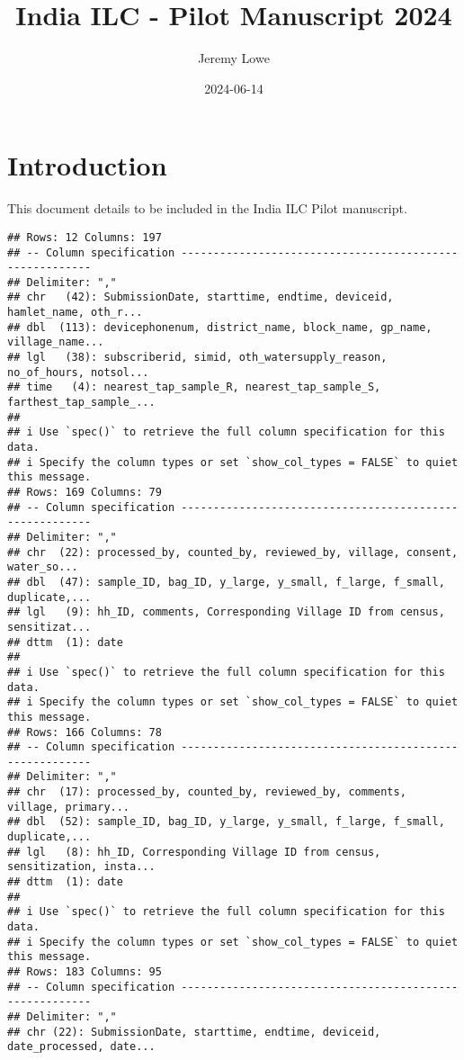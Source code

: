 \documentclass[
]{article}
\title{India ILC - Pilot Manuscript 2024}
\author{Jeremy Lowe}
\date{2024-06-14}
\begin{document}
\maketitle

\hypertarget{introduction}{%
\section{Introduction}\label{introduction}}

This document details to be included in the India ILC Pilot manuscript.

\begin{verbatim}
## Rows: 12 Columns: 197
## -- Column specification --------------------------------------------------------
## Delimiter: ","
## chr   (42): SubmissionDate, starttime, endtime, deviceid, hamlet_name, oth_r...
## dbl  (113): devicephonenum, district_name, block_name, gp_name, village_name...
## lgl   (38): subscriberid, simid, oth_watersupply_reason, no_of_hours, notsol...
## time   (4): nearest_tap_sample_R, nearest_tap_sample_S, farthest_tap_sample_...
## 
## i Use `spec()` to retrieve the full column specification for this data.
## i Specify the column types or set `show_col_types = FALSE` to quiet this message.
## Rows: 169 Columns: 79
## -- Column specification --------------------------------------------------------
## Delimiter: ","
## chr  (22): processed_by, counted_by, reviewed_by, village, consent, water_so...
## dbl  (47): sample_ID, bag_ID, y_large, y_small, f_large, f_small, duplicate,...
## lgl   (9): hh_ID, comments, Corresponding Village ID from census, sensitizat...
## dttm  (1): date
## 
## i Use `spec()` to retrieve the full column specification for this data.
## i Specify the column types or set `show_col_types = FALSE` to quiet this message.
## Rows: 166 Columns: 78
## -- Column specification --------------------------------------------------------
## Delimiter: ","
## chr  (17): processed_by, counted_by, reviewed_by, comments, village, primary...
## dbl  (52): sample_ID, bag_ID, y_large, y_small, f_large, f_small, duplicate,...
## lgl   (8): hh_ID, Corresponding Village ID from census, sensitization, insta...
## dttm  (1): date
## 
## i Use `spec()` to retrieve the full column specification for this data.
## i Specify the column types or set `show_col_types = FALSE` to quiet this message.
## Rows: 183 Columns: 95
## -- Column specification --------------------------------------------------------
## Delimiter: ","
## chr (22): SubmissionDate, starttime, endtime, deviceid, date_processed, date...

\end{verbatim}
\end{document}
